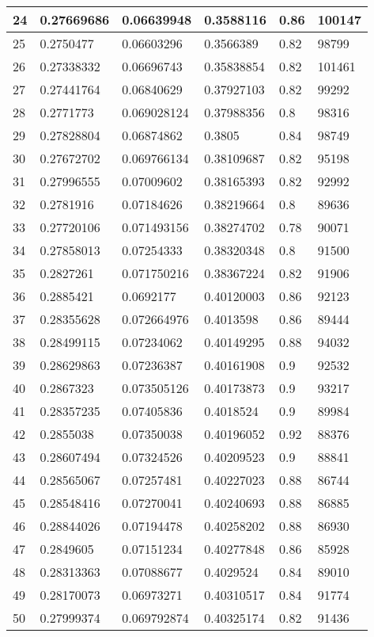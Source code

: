 \begin{longtable}{|l|l|l|l|l|l|}
24 & 0.27669686 & 0.06639948 & 0.3588116 & 0.86 & 100147 \\ \hline 
25 & 0.2750477 & 0.06603296 & 0.3566389 & 0.82 & 98799 \\ \hline 
26 & 0.27338332 & 0.06696743 & 0.35838854 & 0.82 & 101461 \\ \hline 
27 & 0.27441764 & 0.06840629 & 0.37927103 & 0.82 & 99292 \\ \hline 
28 & 0.2771773 & 0.069028124 & 0.37988356 & 0.8 & 98316 \\ \hline 
29 & 0.27828804 & 0.06874862 & 0.3805 & 0.84 & 98749 \\ \hline 
30 & 0.27672702 & 0.069766134 & 0.38109687 & 0.82 & 95198 \\ \hline 
31 & 0.27996555 & 0.07009602 & 0.38165393 & 0.82 & 92992 \\ \hline 
32 & 0.2781916 & 0.07184626 & 0.38219664 & 0.8 & 89636 \\ \hline 
33 & 0.27720106 & 0.071493156 & 0.38274702 & 0.78 & 90071 \\ \hline 
34 & 0.27858013 & 0.07254333 & 0.38320348 & 0.8 & 91500 \\ \hline 
35 & 0.2827261 & 0.071750216 & 0.38367224 & 0.82 & 91906 \\ \hline 
36 & 0.2885421 & 0.0692177 & 0.40120003 & 0.86 & 92123 \\ \hline 
37 & 0.28355628 & 0.072664976 & 0.4013598 & 0.86 & 89444 \\ \hline 
38 & 0.28499115 & 0.07234062 & 0.40149295 & 0.88 & 94032 \\ \hline 
39 & 0.28629863 & 0.07236387 & 0.40161908 & 0.9 & 92532 \\ \hline 
40 & 0.2867323 & 0.073505126 & 0.40173873 & 0.9 & 93217 \\ \hline 
41 & 0.28357235 & 0.07405836 & 0.4018524 & 0.9 & 89984 \\ \hline 
42 & 0.2855038 & 0.07350038 & 0.40196052 & 0.92 & 88376 \\ \hline 
43 & 0.28607494 & 0.07324526 & 0.40209523 & 0.9 & 88841 \\ \hline 
44 & 0.28565067 & 0.07257481 & 0.40227023 & 0.88 & 86744 \\ \hline 
45 & 0.28548416 & 0.07270041 & 0.40240693 & 0.88 & 86885 \\ \hline 
46 & 0.28844026 & 0.07194478 & 0.40258202 & 0.88 & 86930 \\ \hline 
47 & 0.2849605 & 0.07151234 & 0.40277848 & 0.86 & 85928 \\ \hline 
48 & 0.28313363 & 0.07088677 & 0.4029524 & 0.84 & 89010 \\ \hline 
49 & 0.28170073 & 0.06973271 & 0.40310517 & 0.84 & 91774 \\ \hline 
50 & 0.27999374 & 0.069792874 & 0.40325174 & 0.82 & 91436 \\ \hline 
\end{longtable}